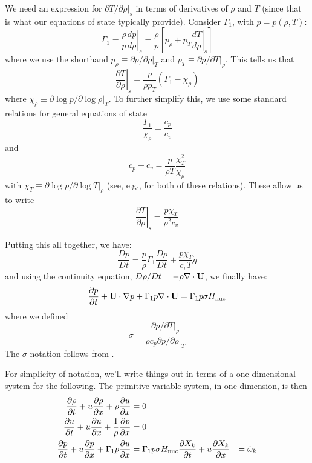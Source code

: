 We need an expression for $\partial T/\partial \rho |_s$ in terms of
derivatives of $\rho$ and $T$ (since that is what our equations of
state typically provide).  Consider $\Gamma_1$, with $p = p(\rho, T)$:
\begin{equation}
  \Gamma_1 = \frac{\rho}{p} \left . \frac{dp}{d\rho} \right |_s
  = \frac{\rho}{p} \left [ p_\rho + p_T \left . \frac{dT}{d\rho} \right |_s \right ]
\end{equation}
where we use the shorthand $p_\rho \equiv \partial p/\partial \rho |_T$ and
$p_T \equiv \partial p/\partial T |_\rho$.  This tells us that
\begin{equation}
  \left . \frac{\partial T}{\partial \rho} \right |_s = \frac{p}{\rho p_T} (\Gamma_1 - \chi_\rho)
\end{equation}
where $\chi_\rho \equiv \partial \log p / \partial \log \rho |_T$.  To further simplify this,
we use some standard relations for general equations of state
\begin{equation}
\frac{\Gamma_1}{\chi_\rho} = \frac{c_p}{c_v}
\end{equation}
and
\begin{equation}
  c_p - c_v = \frac{p}{\rho T} \frac{\chi_T^2}{\chi_\rho}
\end{equation}
with $\chi_T \equiv \partial \log p / \partial \log T |_\rho$
(see, e.g., \cite{HKT} for both of these relations).  These allow us to write
\begin{equation}
  \left . \frac{\partial T}{\partial \rho} \right |_s = \frac{p\chi_T}{\rho^2 c_v}
\end{equation}

Putting this all together, we have:
\begin{equation}
\frac{Dp}{Dt} = \frac{p}{\rho}\Gamma_1  \frac{D\rho}{Dt}
   + \frac{p \chi_T}{c_v T} \dot{q}
\end{equation}
and using the continuity equation, $D\rho/Dt = -\rho \nabla \cdot {\bf U}$, 
we finally have:
\begin{equation}
\label{eq:reacting:p}
{\frac{{\partial p}}{\partial t}} + {\bf U} \cdot \nabla p + \Gamma_1 p \nabla \cdot {\bf U} = \Gamma_1 p \sigma {H_\mathrm{nuc}}
\end{equation}
where we defined
\begin{equation}
\sigma = \frac{\partial p/\partial T |_\rho}{\rho c_p \partial p/\partial \rho |_T}
\end{equation}
The $\sigma$ notation follows from \cite{ABRZ:II}.

For simplicity of notation, we'll write things out in terms of a
one-dimensional system for the following.  The primitive variable
system, in one-dimension, is then
\begin{align}
{\frac{{\partial\rho}}{\partial t}} + u {\frac{{\partial\rho}}{\partial x}} + \rho {\frac{{\partial u}}{\partial x}} &= 0\\
{\frac{{\partial u}}{\partial t}} + u {\frac{{\partial u}}{\partial x}} + \frac{1}{\rho} {\frac{{\partial p}}{\partial x}} &= 0\\
{\frac{{\partial p}}{\partial t}} + u {\frac{{\partial p}}{\partial x}} + \Gamma_1 p {\frac{{\partial u}}{\partial x}} &= \Gamma_1 p \sigma {H_\mathrm{nuc}}
{\frac{{\partial X_k}}{\partial t}} + u {\frac{{\partial X_k}}{\partial x}} &= {\dot{\omega}}_k \\
\end{align}


